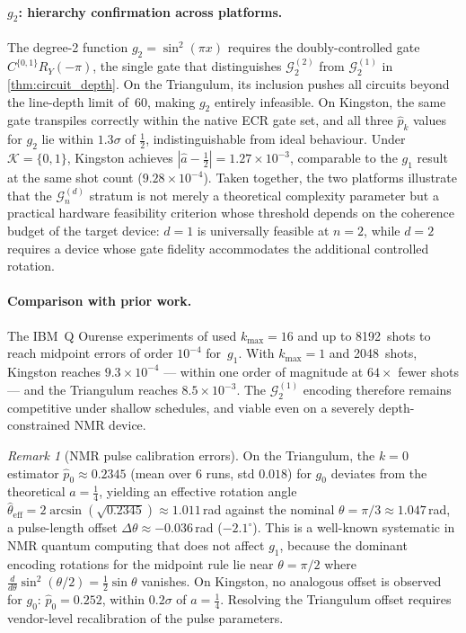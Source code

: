 \documentclass[12pt,a4paper]{article}
\theoremstyle{plain}
\theoremstyle{definition}
\theoremstyle{remark}
\newtheorem{remark}[remark]{Remark}
\newcommand{\Gclass}[2]{\mathcal{G}_{#1}^{(#2)}}
\begin{document}
\paragraph{$g_2$: hierarchy confirmation across platforms.}
The degree-2 function $g_2=\sin^2(\pi x)$ requires the
doubly-controlled gate $C^{\{0,1\}}R_Y(-\pi)$, the single gate
that distinguishes $\Gclass{2}{2}$ from $\Gclass{2}{1}$ in
\cref{thm:circuit_depth}.
On the Triangulum, its inclusion pushes all circuits beyond the
line-depth limit of~60, making $g_2$ entirely infeasible.
On Kingston, the same gate transpiles correctly within the native
ECR gate set, and all three $\hat{p}_k$ values for $g_2$
lie within $1.3\sigma$ of $\tfrac{1}{2}$, indistinguishable from
ideal behaviour.
Under $\mathcal{K}=\{0,1\}$, Kingston achieves
$|\hat{a}-\tfrac{1}{2}|=1.27\times10^{-3}$, comparable to the
$g_1$ result at the same shot count ($9.28\times10^{-4}$).
Taken together, the two platforms illustrate that the
$\Gclass{n}{d}$ stratum is not merely a theoretical complexity
parameter but a practical hardware feasibility criterion whose
threshold depends on the coherence budget of the target device:
$d=1$ is universally feasible at $n=2$, while $d=2$ requires
a device whose gate fidelity accommodates the additional
controlled rotation.

\paragraph{Comparison with prior work.}
The IBM~Q Ourense experiments of \cite{CarreraVazquezWoerner2020}
used $k_{\max}=16$ and up to 8192~shots to reach midpoint errors of
order $10^{-4}$ for~$g_1$.
With $k_{\max}=1$ and 2048~shots, Kingston reaches
$9.3\times10^{-4}$ --- within one order of magnitude at $64\times$
fewer shots --- and the Triangulum reaches $8.5\times10^{-3}$.
The $\Gclass{2}{1}$ encoding therefore remains competitive under
shallow schedules, and viable even on a severely depth-constrained
NMR device.

\begin{remark}[NMR pulse calibration errors]
\label{rem:nmr_calibration}
On the Triangulum, the $k=0$ estimator $\hat{p}_0\approx0.2345$
(mean over 6 runs, std $0.018$) for $g_0$ deviates from the
theoretical $a=\tfrac{1}{4}$, yielding an effective rotation angle
$\hat\theta_{\mathrm{eff}}=2\arcsin(\sqrt{0.2345})\approx1.011$\,rad
against the nominal $\theta=\pi/3\approx1.047$\,rad,
a pulse-length offset $\Delta\theta\approx-0.036$\,rad ($-2.1^\circ$).
This is a well-known systematic in NMR quantum computing
\cite{VandersypenChuang2005} that does not affect $g_1$,
because the dominant encoding rotations for the midpoint rule
lie near $\theta=\pi/2$ where
$\tfrac{d}{d\theta}\sin^2(\theta/2)=\tfrac{1}{2}\sin\theta$ vanishes.
On Kingston, no analogous offset is observed for $g_0$:
$\hat{p}_0=0.252$, within $0.2\sigma$ of $a=\tfrac{1}{4}$.
Resolving the Triangulum offset requires vendor-level
recalibration of the pulse parameters.
\end{remark}
\end{document}
